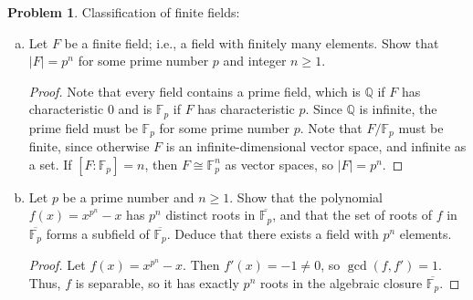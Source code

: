 \documentclass[11pt]{article}
\newcommand{\Q}{\mathbb{Q}}
\newcommand{\F}{\mathbb{F}}
\theoremstyle{definition}
\newtheorem{problem}{Problem}
\begin{document}
\begin{problem} Classification of finite fields:
\begin{enumerate}[(a)]
\item Let $F$ be a finite field; i.e., a field with finitely many elements. Show that $|F|=p^n$ for some prime number $p$ and integer $n\geq 1$.
\begin{proof}
Note that every field contains a prime field, which is $\Q$ if $F$ has characteristic $0$ and is $\F_p$ if $F$ has characteristic $p$. Since $\Q$ is infinite, the prime field must be $\F_p$ for some prime number $p$. Note that $F/\F_p$ must be finite, since otherwise $F$ is an infinite-dimensional vector space, and infinite as a set. If $[F:\F_p] = n$, then $F\cong \F_p^n$ as vector spaces, so $|F|=p^n$. 
\end{proof}
\item Let $p$ be a prime number and $n\geq 1$. Show that the polynomial $f(x)=x^{p^n}-x$ has $p^n$ distinct roots in $\overline{\mathbb{F}_p}$, and that the set of roots of $f$ in $\overline{\mathbb{F}_p}$ forms a subfield of $\overline{\mathbb{F}_p}$. Deduce that there exists a field with $p^n$ elements.
\begin{proof}
Let $f(x)=x^{p^n}-x$. Then $f'(x)=-1\neq 0$, so $\gcd(f,f')=1$. Thus, $f$ is separable, so it has exactly $p^n$ roots in the algebraic closure $\overline{\mathbb{F}_p}$.


\end{proof}
\end{enumerate}
\end{problem}
\end{document}
